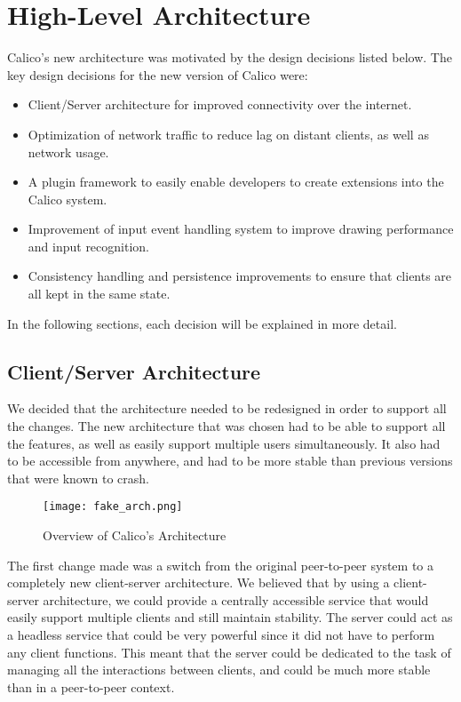 \chapter{High-Level Architecture}

Calico's new architecture was motivated by the design decisions listed below. 
The key design decisions for the new version of Calico were:

\begin{itemize}\itemsep1pt
  \item Client/Server architecture for improved connectivity over the internet.
  \item Optimization of network traffic to reduce lag on distant clients, as well as network usage.
  \item A plugin framework to easily enable developers to create extensions into the Calico system.
  \item Improvement of input event handling system to improve drawing performance and input recognition.
  \item Consistency handling and persistence improvements to ensure that clients are all kept in the same state.
\end{itemize}

In the following sections, each decision will be explained in more detail.



\section{Client/Server Architecture}
We decided that the architecture needed to be redesigned in order to support all the changes. The new architecture that was chosen had to be able to support all the features, as well as easily support multiple users simultaneously. It also had to be accessible from anywhere, and had to be more stable than previous versions that were known to crash.

\begin{figure}[h]
\centering
\texttt{[image: fake\_arch.png]}
\caption{Overview of Calico's Architecture}
\label{fig:calico_arch}
\end{figure}

The first change made was a switch from the original peer-to-peer system to a completely new client-server architecture. We believed that by using a client-server architecture, we could provide a centrally accessible service that would easily support multiple clients and still maintain stability. The server could act as a headless service that could be very powerful since it did not have to perform any client functions. This meant that the server could be dedicated to the task of managing all the interactions between clients, and could be much more stable than in a peer-to-peer context.

